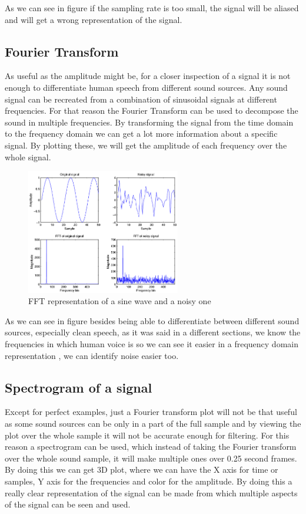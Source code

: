 As we can see in figure  if the sampling rate is too small, the signal will be aliased and will get a wrong representation of the signal.

\subsection{Fourier Transform}
As useful as the amplitude might be, for a closer inspection of a signal it is not enough to differentiate human speech from different sound sources. Any sound signal can be recreated from a combination of sinusoidal signals at different frequencies.  For that reason the Fourier Transform can be used to decompose the sound in multiple frequencies. By transforming the signal from the time domain to the frequency domain we can get a lot more information about a specific signal. By plotting these, we will get the amplitude of each frequency over the whole signal.

\begin{figure}[htp]
	\centering
	\includegraphics[width=0.6\textwidth]{Illustrations/fftSignals.png}
	\caption{FFT representation of a sine wave and a noisy one}
	\label{fig:fftSignal}
\end{figure}
\newpage
As we can see in figure  besides being able to differentiate between different sound sources, especially clean speech, as it was said in a different sections, we know the frequencies in which human voice is so we can see it easier in a frequency domain representation , we can identify noise easier too.

\subsection{Spectrogram of a signal}
Except for perfect examples, just a Fourier transform plot will not be that useful as some sound sources can be only in a part of the full sample and by viewing the plot over the whole sample it will not be accurate enough for filtering. For this reason a spectrogram can be used, which instead of taking the Fourier transform over the whole sound sample, it will make multiple ones over 0.25 second frames. By doing this we can get 3D plot, where we can have the X axis for time or samples, Y axis for the frequencies and color for the amplitude. By doing this a really clear representation of the signal can be made from which multiple aspects of the signal can be seen and used.

